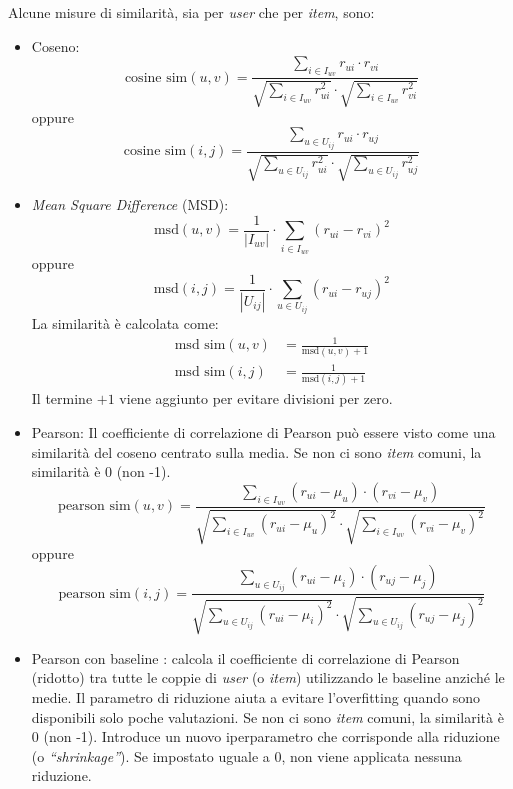 Alcune misure di similarità, sia per \textit{user} che per \textit{item}, sono:
\begin{itemize}
    \item Coseno:
        \[
        \text{cosine sim}(u, v) = \frac{\sum\limits_{i \in I_{uv}} r_{ui} \cdot r_{vi}}{\sqrt{\sum\limits_{i \in I_{uv}} r_{ui}^2} \cdot \sqrt{\sum\limits_{i \in I_{uv}} r_{vi}^2}}
        \]
        oppure
        \[
        \text{cosine sim}(i, j) = \frac{\sum\limits_{u \in U_{ij}} r_{ui} \cdot r_{uj}}{\sqrt{\sum\limits_{u \in U_{ij}} r_{ui}^2} \cdot \sqrt{\sum\limits_{u \in U_{ij}} r_{uj}^2}}
        \]
    \item \textit{Mean Square Difference} (MSD):
        \[
        \text{msd}(u, v) = \frac{1}{|I_{uv}|} \cdot \sum\limits_{i \in I_{uv}} (r_{ui} - r_{vi})^2
        \]
        oppure
        \[
        \text{msd}(i, j) = \frac{1}{|U_{ij}|} \cdot \sum\limits_{u \in U_{ij}} (r_{ui} - r_{uj})^2
        \]
        La similarità è calcolata come:
        \begin{align*}
            \text{msd sim}(u, v) &= \frac{1}{\text{msd}(u, v) + 1} \\
            \text{msd sim}(i, j) &= \frac{1}{\text{msd}(i, j) + 1}
        \end{align*}
        Il termine $+1$ viene aggiunto per evitare divisioni per zero.
    \item Pearson: Il coefficiente di correlazione di Pearson può essere visto come una similarità del coseno centrato sulla media. Se non ci sono \textit{item} comuni, la similarità è 0 (non -1).
        \[
        \text{pearson sim}(u, v) = \frac{\sum\limits_{i \in I_{uv}} (r_{ui} - \mu_u) \cdot (r_{vi} - \mu_v)}{\sqrt{\sum\limits_{i \in I_{uv}} (r_{ui} - \mu_u)^2} \cdot \sqrt{\sum\limits_{i \in I_{uv}} (r_{vi} - \mu_v)^2}}
        \]
        oppure
        \[
        \text{pearson sim}(i, j) = \frac{\sum\limits_{u \in U_{ij}} (r_{ui} - \mu_i) \cdot (r_{uj} - \mu_j)}{\sqrt{\sum\limits_{u \in U_{ij}} (r_{ui} - \mu_i)^2} \cdot \sqrt{\sum\limits_{u \in U_{ij}} (r_{uj} - \mu_j)^2}}
        \]
    \item Pearson con baseline \cite{Recommendation_book}: calcola il coefficiente di correlazione di Pearson (ridotto) tra tutte le coppie di \textit{user} (o \textit{item}) utilizzando le baseline anziché le medie. Il parametro di riduzione aiuta a evitare l'overfitting quando sono disponibili solo poche valutazioni. Se non ci sono \textit{item} comuni, la similarità è 0 (non -1). Introduce un nuovo iperparametro che corrisponde alla riduzione (o \textit{``shrinkage''}). Se impostato uguale a 0, non viene applicata nessuna riduzione.

\end{itemize}
